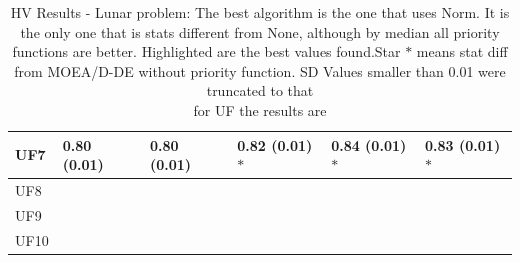 \begin{table}[!t]
\begin{tabular}{llllll}
		\multicolumn{1}{|l|}{UF7}              & \multicolumn{1}{l}{0.80 (0.01)} & \multicolumn{1}{l}{0.80 (0.01)} & \multicolumn{1}{l}{ 0.82 (0.01)$*$} & \textbf{0.84 (0.01)$*$}             & 0.83 (0.01)$*$ \\ \hline
		UF8                                           &                          &                          &                          &                           &                             \\
		UF9                                           &                          &                          &                          &                           &                             \\
		UF10                                          &                          &                          &                          &                           &                            
	\end{tabular}
	\caption{HV Results - Lunar problem: The best algorithm is the one that uses Norm. It is the only one that is stats different from None, although by median all priority functions are better. Highlighted are the best values found.Star $*$ means stat diff from MOEA/D-DE without priority function. SD Values smaller than 0.01 were truncated to that\\ for UF the results are}
	\label{table_hv}
\end{table}

